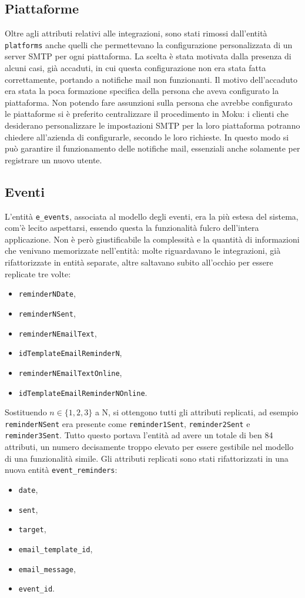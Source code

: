 \subsection{Piattaforme}
Oltre agli attributi relativi alle integrazioni, sono stati rimossi dall'entità \verb|platforms| anche quelli che permettevano la configurazione personalizzata di un server SMTP per ogni piattaforma. La scelta è stata motivata dalla presenza di alcuni casi, già accaduti, in cui questa configurazione non era stata fatta correttamente, portando a notifiche mail non funzionanti. Il motivo dell'accaduto era stata la poca formazione specifica della persona che aveva configurato la piattaforma. Non potendo fare assunzioni sulla persona che avrebbe configurato le piattaforme si è preferito centralizzare il procedimento in Moku: i clienti che desiderano personalizzare le impostazioni SMTP per la loro piattaforma potranno chiedere all'azienda di configurarle, secondo le loro richieste. In questo modo si può garantire il funzionamento delle notifiche mail, essenziali anche solamente per registrare un nuovo utente.


\subsection{Eventi}
L'entità \verb|e_events|, associata al modello degli eventi, era la più estesa del sistema, com'è lecito aspettarsi, essendo questa la funzionalità fulcro dell'intera applicazione. Non è però giustificabile la complessità e la quantità di informazioni che venivano memorizzate nell'entità: molte riguardavano le integrazioni, già rifattorizzate in entità separate, altre saltavano subito all'occhio per essere replicate tre volte:
\begin{itemize}
	\item \verb|reminderNDate|,
	\item \verb|reminderNSent|,
	\item \verb|reminderNEmailText|,
	\item \verb|idTemplateEmailReminderN|,
	\item \verb|reminderNEmailTextOnline|,
	\item \verb|idTemplateEmailReminderNOnline|.
\end{itemize}
Sostituendo $n \in \{1,2,3\}$ a N, si ottengono tutti gli attributi replicati, ad esempio \verb|reminderNSent| era presente come \verb|reminder1Sent|, \verb|reminder2Sent| e \verb|reminder3Sent|. Tutto questo portava l'entità ad avere un totale di ben 84 attributi, un numero decisamente troppo elevato per essere gestibile nel modello di una funzionalità simile. Gli attributi replicati sono stati rifattorizzati in una nuova entità \verb|event_reminders|:
\begin{itemize}
	\item \verb|date|,
	\item \verb|sent|,
	\item \verb|target|,
	\item \verb|email_template_id|,
	\item \verb|email_message|,
	\item \verb|event_id|.
\end{itemize}

